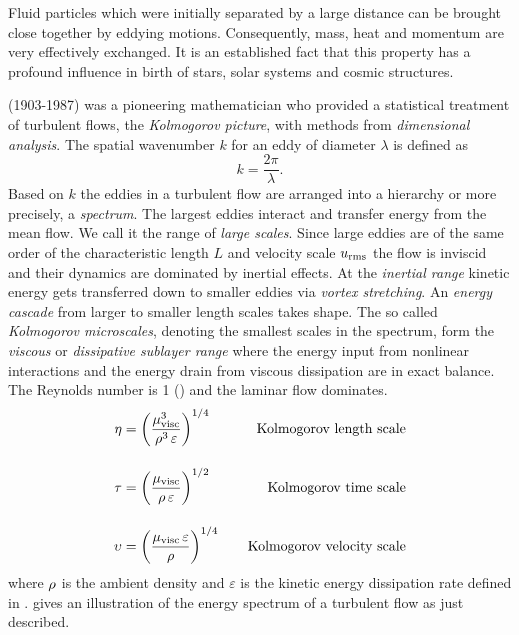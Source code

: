 Fluid particles which were initially separated by a large distance can be
brought close together by eddying motions. Consequently, mass, heat and
momentum are very effectively exchanged. It is an established fact that this
property has a profound influence in birth of stars, solar systems and cosmic
structures.

 (1903-1987) was a pioneering mathematician who provided
a statistical treatment of turbulent flows, the \emph{Kolmogorov picture}, with
methods from \emph{dimensional analysis}. The spatial wavenumber $k$ for an
eddy of diameter $\lambda$ is defined as
\begin{equation}
\label{eqn:wave-number}
    k = \frac{2\pi}{\lambda}.
\end{equation}
Based on $k$ the eddies in a turbulent flow are arranged into a hierarchy or
more precisely, a \emph{spectrum}. The largest eddies interact and transfer
energy from the mean flow.  We call it the range of \emph{large scales}. Since
large eddies are of the same order of the characteristic length $L$ and
velocity scale $u_{\text{rms}}$ the flow is inviscid and their dynamics are dominated by
inertial effects. At the \emph{inertial range} kinetic energy gets transferred
down to smaller eddies via \emph{vortex stretching}. An \emph{energy cascade}
from larger to smaller length scales takes shape. The so called
\emph{Kolmogorov microscales}, denoting the smallest scales in the spectrum,
form the \emph{viscous} or \emph{dissipative sublayer range} where the energy
input from nonlinear interactions and the energy drain from viscous dissipation
are in exact balance. The Reynolds number is 1 () and the
laminar flow dominates.
\begin{align}
\label{eqn:kolmogorov-scales}
    \eta     &= \left(\frac{\mu_{\text{visc}}^3}{\rho^3\,\varepsilon}\right)^{1/4} \;\;\;\; &\text{Kolmogorov length scale} \\[0.4cm]
    \tau     &= \left(\frac{\mu_{\text{visc}}}{\rho\,\varepsilon}\right)^{1/2} \;\;\;\; &\text{Kolmogorov time scale} \\[0.4cm]
    \upsilon &= \left(\frac{\mu_{\text{visc}}\,\varepsilon}{\rho}\right)^{1/4} \;\;\;\; &\text{Kolmogorov velocity scale}
\end{align}
where $\rho$ is the ambient density and $\varepsilon$ is the
kinetic energy dissipation rate defined in .
 gives an illustration of the energy
spectrum of a turbulent flow as just described.

